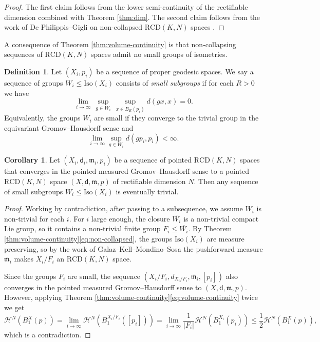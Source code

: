 \documentclass[12pt]{amsart}
\theoremstyle{definition}
\def\fnum{equation}
\newtheorem{corollary}[\fnum]{Corollary}
\newtheorem{definition}[\fnum]{Definition}
\numberwithin{equation}{section}
\newcommand{\iso}{\text{Iso}}
\newcommand{\rcd}{\text{RCD}}
\newcommand{\mm}{\mathfrak{m}}
\begin{document}
\begin{proof}
    The first claim follows from the lower semi-continuity of the rectifiable dimension \cite[Theorem 1.5]{kitabeppu} combined with Theorem \ref{thm:dim}. The second claim follows from the work of De Philippis--Gigli on non-collapsed $\rcd (K,N)$ spaces \cite[Theorem 1.3]{de-philippis-gigli}.
\end{proof}

A consequence of Theorem \ref{thm:volume-continuity}   is that non-collapsing sequences of $\rcd (K,N)$ spaces admit no small groups of isometries.


\begin{definition}
    Let $(X_i, p_i)$ be a sequence of proper geodesic spaces. We say a sequence of groups $W_i \leq \iso (X_i) $ consists of \emph{small subgroups} if for each $R > 0 $ we have
    \[    \lim _{i \to \infty } \, \sup _{g \in W_i}\,  \sup _{x \in B_R(p_i)} d(gx,x) = 0 .         \]
    Equivalently, the groups $W_i$ are small if they converge to the trivial group in the equivariant Gromov--Hausdorff sense and 
    \[     \lim_{i \to \infty} \sup _{g \in W_i} d(gp_i, p_i) < \infty .          \] 
\end{definition}

\begin{corollary}\label{cor:no-small-subgroups}
    Let $(X_i, \mathsf{d}_i, \mm_i, p_i )$ be a sequence of pointed  $\rcd (K, N)$ spaces that converges in the pointed measured Gromov--Hausdorff sense to a pointed $\rcd (K,N)$ space $(X , \mathsf{d}, \mm  , p)$ of rectifiable dimension $N$. Then any sequence of small subgroups $W_i \leq \iso (X_i)$ is eventually trivial.
\end{corollary}

\begin{proof}
    Working by contradiction, after passing to a subsequence, we assume $W_i$ is non-trivial for each $i$. For $i$ large enough, the closure $\overline{W_i}$ is a non-trivial compact Lie group, so it contains a non-trivial finite group $F_i \leq \overline{W_i}$. By Theorem \ref{thm:volume-continuity}\eqref{eq:non-collapsed}, the groups $\iso (X_i )$ are measure preserving, so by the work of Galaz--Kell--Mondino--Sosa \cite[Theorem 1.1]{galaz-kell-mondino-sosa} the pushforward measure $\overline{\mm}_i$ makes $X_i / F_i $ an $\rcd (K,N)$ space. 


    Since the groups $F_i$ are small, the sequence $(X_i/F_i , d_{X_i/F_i} , \overline{\mm}_i , [p_i] )$ also converges in the pointed measured Gromov--Hausdorff sense to $(X, \mathsf{d}, \mm , p)$. However, applying Theorem \ref{thm:volume-continuity}\eqref{eq:volume-continuity} twice we get
\[  \mathcal{H}^N (B_1^X(p)) =    \lim_{i \to \infty } \mathcal{H}^N (B_1^{X_i / F_i} ([p_i]))  =  \lim_{i \to \infty } \frac{1}{\vert F_i \vert  }  \mathcal{H}^N (B_1^{X_i} (p_i)) \leq \frac{1}{2}  \mathcal{H}^N (B_1^X(p)) ,     \]
which is a contradiction.
\end{proof}
\end{document}
